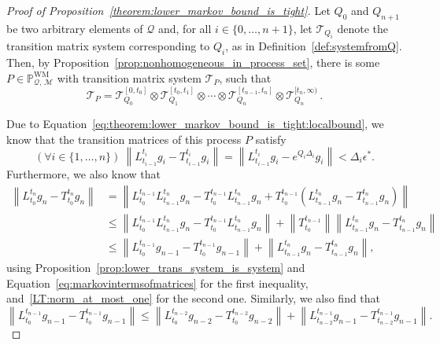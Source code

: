 \documentclass[10pt,a4paper]{paper}
\theoremstyle{definition}
\newcommand{\processes}{\mathbb{P}}
\newcommand{\wmprocesses}{\processes^{\mathrm{WM}}}
\newcommand{\rateset}{\mathcal{Q}}
\newcommand{\norm}[1]{\left\lVert #1 \right\rVert}
\begin{document}
\begin{proof}[Proof of Proposition~\ref{theorem:lower_markov_bound_is_tight}]
Let $Q_0$ and $Q_{n+1}$ be two arbitrary elements of $\rateset$ and, for all $i\in\{0,\ldots,n+1\}$, let $\mathcal{T}_{Q_i}$ denote the transition matrix system corresponding to $Q_i$, as in Definition~\ref{def:systemfromQ}. Then, by Proposition~\ref{prop:nonhomogeneous_in_process_set}, there is some $P\in\wmprocesses_{\rateset,\,\mathcal{M}}$ with transition matrix system $\mathcal{T}_P$, such that
\begin{equation*}
\mathcal{T}_P = \mathcal{T}_{Q_0}^{[0,t_0]}\otimes \mathcal{T}_{Q_1}^{[t_0,t_1]}\otimes \cdots \otimes \mathcal{T}_{Q_n}^{[t_{n-1},t_n]} \otimes \mathcal{T}_{Q_n}^{[t_{n},\infty)}\,.
\end{equation*}

Due to Equation~\eqref{eq:theorem:lower_markov_bound_is_tight:localbound}, we know that the transition matrices of this process $P$ satisfy
\begin{equation}\label{eq:theorem:lower_markov_bound_is_tight:localbounds}
(\forall i\in\{1,\ldots,n\})~
\norm{L_{t_{i-1}}^{t_i}g_i - T_{t_{i-1}}^{t_i}g_i}= \norm{L_{t_{i-1}}^{t_i}g_i - e^{Q_i\Delta_i}g_i}<\Delta_i\epsilon^*.
\end{equation}
Furthermore, we also know that
\begin{align*}
\norm{L_{t_0}^{t_n}g_n - T_{t_0}^{t_n}g_n}
&=\norm{L_{t_0}^{t_{n-1}}L_{t_{n-1}}^{t_n}g_n - T_{t_0}^{t_{n-1}}L_{t_{n-1}}^{t_n}g_n+T_{t_0}^{t_{n-1}}(L_{t_{n-1}}^{t_n}g_n - T_{t_{n-1}}^{t_n}g_n)} \\ 
 &\leq \norm{L_{t_0}^{t_{n-1}}L_{t_{n-1}}^{t_n}g_n - T_{t_0}^{t_{n-1}}L_{t_{n-1}}^{t_n}g_n} + \norm{T_{t_0}^{t_{n-1}}}\norm{L_{t_{n-1}}^{t_n}g_n - T_{t_{n-1}}^{t_n}g_n} \\
 &\leq \norm{L_{t_0}^{t_{n-1}}g_{n-1} - T_{t_0}^{t_{n-1}}g_{n-1}} + \norm{L_{t_{n-1}}^{t_n}g_n - T_{t_{n-1}}^{t_n}g_n},
\end{align*}
using Proposition~\ref{prop:lower_trans_system_is_system} and Equation~\eqref{eq:markovintermsofmatrices} for the first inequality, and~\ref{LT:norm_at_most_one} for the second one.
Similarly, we also find that
\begin{equation*}
\norm{L_{t_0}^{t_{n-1}}g_{n-1} - T_{t_0}^{t_{n-1}}g_{n-1}}
\leq \norm{L_{t_0}^{t_{n-2}}g_{n-2} - T_{t_0}^{t_{n-2}}g_{n-2}} + \norm{L_{t_{n-2}}^{t_{n-1}}g_{n-1} - T_{t_{n-2}}^{t_{n-1}}g_{n-1}}.
\end{equation*}

\end{proof}
\end{document}

